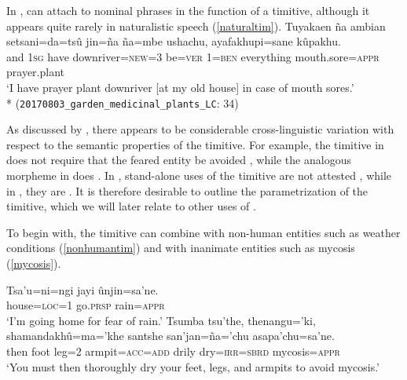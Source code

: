 \documentclass[output=paper,colorlinks,citecolor=brown]{langscibook}
\begin{document}
In ,  can attach to nominal phrases in the function of a timitive, although it appears quite rarely in naturalistic speech (\ref{naturaltim}).
    \ea \label{naturaltim} %
    \gll Tuyakaen ña     ambian setsani=da=tsû     jin=ña  ña=mbe   ushachu,   {{\ob}ayafakhupi=sane{\cb}}      kûpakhu. \\
         and      \textsc{1sg} have   downriver=\textsc{new=}3 be=\textsc{ver} \textsc{1=ben} everything {mouth.sore=\textsc{appr}} {prayer.plant} \\
    \glt `I have prayer plant downriver [at my old house] in case of mouth sores.' \\*
    \hfill (\texttt{20170803\_garden\_medicinal\_plants\_LC}: {\textsc{34}})
    \z

As discussed by \citet{vuillermet2018a}, there appears to be considerable cross-lin\-guis\-tic variation with respect to the semantic properties of the timitive. For example, the timitive in  does not require that the feared entity be avoided \citep{vuillermet2018a}, while the analogous morpheme in  does \citep{green1989marrithiyel}. In , stand-alone uses of the timitive are not attested \citep{vuillermet2018a}, while in , they are \citep{aikhenvald2008manambu}. It is therefore desirable to outline the parametrization of the  timitive, which we will later relate to other uses of \sane.
    
To begin with, the timitive  can combine with non-human entities such as weath\-er conditions (\ref{nonhumantim}) and with inanimate entities such as mycosis (\ref{mycosis}).
\begin{exe}
    \ex \label{nonhumantim}
    \gll Tsa'u=ni=ngi   jayi       {\ob}ûnjin=sa'ne.{\cb} \\
         house=\textsc{loc=}1 go.\textsc{prsp} rain=\textsc{appr}  \\
    \glt `I'm going home for fear of rain.'
    \ex \label{mycosis} %
    \gll Tsumba tsu'the, thenangu='ki, shamandakhû=ma='khe santshe        san'jan=ña='chu {\ob}asapa'chu=sa'ne.{\cb} \\
         then   foot     leg\textsc{=}2      armpit=\textsc{acc=add}     drily dry=\textsc{irr=sbrd}     mycosis=\textsc{appr} \\
    \glt `You must then thoroughly dry your feet, legs, and armpits to avoid mycosis.'  \hfill \citep[p. 11]{pederson1982quinsetsse}
\end{exe}
    
\end{document}
